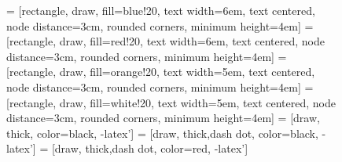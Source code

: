 \documentclass[times,final,nopreprintline]{elsarticle}
\begin{document}
\begin{figure}
\begin{center}
{\footnotesize{
 = [rectangle, draw, fill=blue!20,
    text width=6em, text centered, node distance=3cm, rounded corners, minimum height=4em]
 = [rectangle, draw, fill=red!20,
    text width=6em, text centered, node distance=3cm, rounded corners, minimum height=4em]
 = [rectangle, draw, fill=orange!20,
    text width=5em, text centered, node distance=3cm, rounded corners, minimum height=4em]
 = [rectangle, draw, fill=white!20,
    text width=5em, text centered, node distance=3cm, rounded corners, minimum height=4em]
 = [draw, thick, color=black, -latex']
 = [draw, thick,dash dot, color=black, -latex']
 = [draw, thick,dash dot, color=red, -latex']

}}
\end{center}
\end{figure}
\end{document}
